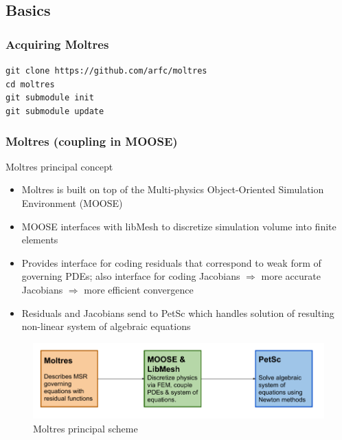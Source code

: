 \subsection{Basics}
\begin{frame}
        \frametitle{Acquiring Moltres}
             \texttt{git clone https://github.com/arfc/moltres}\\
        \texttt{cd moltres}\\
        \texttt{git submodule init}\\
        \texttt{git submodule update}\\
\end{frame}


\begin{frame}
  \frametitle{Moltres (coupling in MOOSE)}
   \begin{block}{Moltres principal concept \cite{lindsay_introduction_2018}}
     \begin{itemize}
        \item Moltres is built on top of the Multi-physics Object-Oriented
Simulation Environment (MOOSE)
		\item MOOSE interfaces with libMesh to discretize simulation volume
into finite elements
		\item Provides interface for coding residuals that correspond to weak
form of governing PDEs; also interface for coding Jacobians $\Rightarrow$
more accurate Jacobians $\Rightarrow$ more efficient convergence
		\item Residuals and Jacobians send to PetSc which handles solution of resulting non-linear system of algebraic equations
     \end{itemize}
    \end{block}
               \begin{figure}[t]
                \vspace*{-0.15in}
                \includegraphics[height=0.24\textwidth]{./images/moltres-moose-diag.png}
                \vspace*{-0.1in}
                \caption{Moltres principal scheme}
               \end{figure}   
\end{frame}

